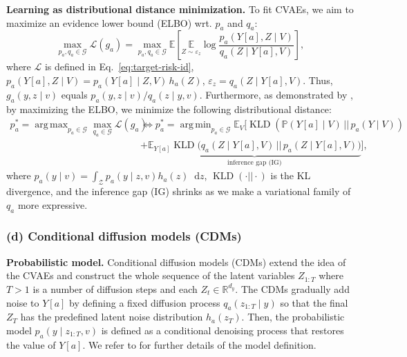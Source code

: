 \documentclass[dvipsnames]{article} %
\DeclareMathOperator*{\argmax}{arg\,max}
\DeclareMathOperator*{\argmin}{arg\,min}
\newcommand*\diff{\mathop{}\!\mathrm{d}}
\begin{document}
\textbf{Learning as distributional distance minimization.} To fit CVAEs, we aim to maximize an evidence lower bound (ELBO) wrt. $p_a$ and $q_a$:
\begin{equation}
    \max_{p_a, q_a \in \mathcal{G}} \mathcal{L}(g_a) = \max_{p_a, q_a \in \mathcal{G}} \mathbb{E}\left[\underset{Z \sim \varepsilon_z }{\mathbb{E}} \log \frac{p_a(Y[a], Z \mid V)}{q_a(Z \mid Y[a], V)}\right],
\end{equation}
where $\mathcal{L}$ is defined in Eq.~\eqref{eq:target-risk-id}, $p_a(Y[a], Z \mid V)  = p_a(Y[a] \mid Z, V) \, h_a(Z)$, $\varepsilon_z = q_a(Z \mid Y[a], V)$. Thus, $g_a(y, z \mid v)$ equals $p_a(y , z \mid v) / q_a(z \mid y, v)$. Furthermore, as demonstrated by \citet{kingma2019introduction}, by maximizing the ELBO, we minimize the following distributional distance:
\begin{align} \label{eq:kld-ig}
    p_a^* = \argmax_{p_a \in \mathcal{G}} \max_{q_a \in \mathcal{G}}  \mathcal{L}(g_a)  & \Longleftrightarrow p_a^* = \argmin_{p_a \in \mathcal{G}} \mathbb{E}_V \bigg[\operatorname{KLD}(\mathbb{P}(Y[a] \mid V) \,|| \, p_a(Y \mid V )) \\
    & +  \underbrace{\mathbb{E}_{Y[a]}\operatorname{KLD}\big(q_a(Z \mid Y[a], V) \,|| \, p_a(Z \mid Y[a], V)\big)}_{\text{inference gap (IG)}} \bigg], \nonumber
\end{align}
where $p_a(y \mid v) = \int_{\mathcal{Z}} p_a(y \mid z, v) h_a(z) \diff z$,  $\operatorname{KLD} (\cdot || \cdot )$ is the KL divergence, and the inference gap (IG) shrinks as we make a variational family of $q_a$ more expressive. 


\subsubsection{(d) Conditional diffusion models (CDMs)} 

\textbf{Probabilistic model.} Conditional diffusion models (CDMs) \citep{ho2020denoising,lutati2023ocd} extend the idea of the CVAEs and construct the whole sequence of the latent variables $Z_{1:T}$ where $T > 1$ is a number of diffusion steps and each $Z_t \in \mathbb{R}^{d_y}$. The CDMs gradually add noise to $Y[a]$ by defining a fixed diffusion process $q_a(z_{1:T} \mid y)$ so that the final $Z_T$ has the predefined latent noise distribution $h_a(z_T)$. Then, the probabilistic model $p_a(y \mid z_{1:T}, v)$ is defined as a conditional denoising process that restores the value of $Y[a]$. We refer to \citet{ma2024diffpo} for further details of the model definition.
\end{document}
